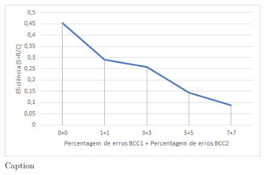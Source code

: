 \documentclass{article}
\begin{document}
\begin{figure}[h]
	\includegraphics[width=\textwidth]{erro.png}
	\caption{Caption}
\end{figure}





	
	
\end{document}

